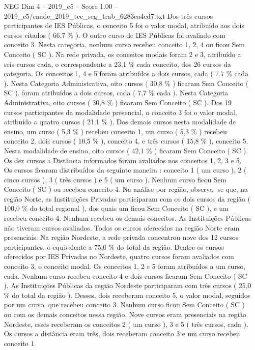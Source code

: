 \begin{textsample}{NEG Dim 4 – 2019\_c5 – Score 1.00 – 2019\_c5/enade\_2019\_tec\_seg\_trab\_6283ea4ed7.txt}
Dos três cursos participantes de IES Públicas, o conceito 5 foi o valor modal, atribuído aos dois cursos citados ( 66,7 \% ).
O outro curso de IES Públicas foi avaliado com conceito 3.
Nesta categoria, nenhum curso recebeu conceito 1, 2, 4 ou ficou Sem Conceito ( SC ).
Na rede privada, os conceitos modais foram 2 e 3, atribuído a seis cursos cada, o correspondente a 23,1 \% cada conceito, dos 26 cursos da categoria.
Os conceitos 1, 4 e 5 foram atribuídos a dois cursos, cada ( 7,7 \% cada ).
Nesta Categoria Administrativa, oito cursos ( 30,8 \% ) ficaram Sem Conceito ( SC ). foram atribuídos a dois cursos, cada ( 7,7 \% cada ).
Nesta Categoria Administrativa, oito cursos ( 30,8 \% ) ficaram Sem Conceito ( SC ).
Dos 19 cursos participantes da modalidade presencial, o conceito 3 foi o valor modal, atribuído a quatro cursos ( 21,1 \% ).
Dos demais cursos nesta modalidade de ensino, um curso ( 5,3 \% ) recebeu conceito 1, um curso ( 5,3 \% ) recebeu conceito 2, dois cursos ( 10,5 \% ), conceito 4, e três cursos ( 15,8 \% ), conceito 5.
Nesta modalidade de ensino, oito cursos ( 42,1 \% ) ficaram Sem Conceito ( SC ).
Os dez cursos a Distância informados foram avaliados nos conceitos 1, 2, 3 e 5.
Os cursos ficaram distribuídos da seguinte maneira : conceito 1 ( um curso ), 2 ( cinco cursos ), 3 ( três cursos ) e 5 ( um curso ).
Nenhum curso ficou Sem Conceito ( SC ) ou recebeu conceito 4.
Na análise por região, observa -se que, na região Norte, as Instituições Privadas participaram com os dois cursos da região ( 100,0 \% do total regional ), dos quais um ficou Sem Conceito ( SC ), e um recebeu conceito 4.
Nenhum recebeu os demais conceitos.
As Instituições Públicas não tiveram cursos avaliados.
Todos os cursos oferecidos na região Norte eram presenciais.
Na região Nordeste, a rede privada concentrou nove dos 12 cursos participantes, o equivalente a 75,0 \% do total da região.
Dentre os cursos oferecidos por IES Privadas no Nordeste, quatro cursos foram avaliados com conceito 3, o conceito modal.
Os conceitos 1, 2 e 5 foram atribuídos a um curso, cada.
Nenhum curso recebeu conceito 4 e dois cursos ficaram Sem Conceito ( SC ).
As Instituições Públicas da região Nordeste participaram com três cursos ( 25,0 \% do total da região ).
Desses, dois receberam conceito 5, o valor modal, seguidos por um curso, que recebeu conceito 3.
Nenhum curso ficou Sem Conceito ( SC ) ou com os demais conceitos nessa região.
Nove cursos eram presenciais na região Nordeste, esses receberam os conceitos 2 ( um curso ), 3 e 5 ( três cursos, cada ).
Os cursos a distância eram três, dois receberam conceito 3 e um curso recebeu conceito 1.

\end{textsample}
